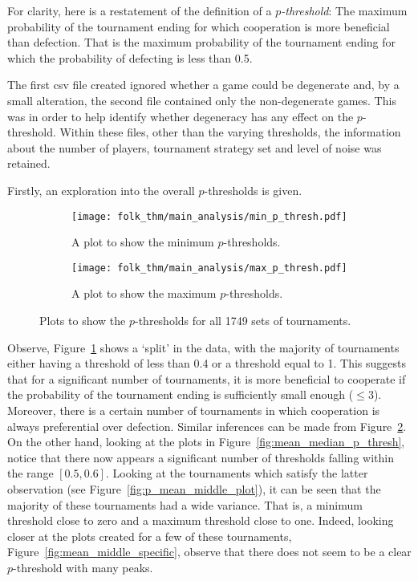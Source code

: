 For clarity, here is a restatement of the definition of a
\textit{\(p\)-threshold}: The maximum probability of the tournament ending for
which cooperation is more beneficial than defection. That is the maximum
probability of the tournament ending for which the probability of defecting is
less than 0.5.

The first csv file created ignored whether a game could be degenerate and, by a
small alteration, the second file contained only the non-degenerate games. This
was in order to help identify whether degeneracy has any effect on the
\(p\)-threshold. Within these files, other than the varying thresholds, the
information about the number of players, tournament strategy set and level of
noise was retained.

Firstly, an exploration into the overall \(p\)-thresholds is given.

\begin{figure}
    \begin{subfigure}{.45\textwidth}
        \centering
        \texttt{[image: folk\_thm/main\_analysis/min\_p\_thresh.pdf]}
        \caption{A plot to show the minimum \(p\)-thresholds.}\label{subfig:min_p_thresh}
    \end{subfigure}
    \begin{subfigure}{.45\textwidth}
        \centering
        \texttt{[image: folk\_thm/main\_analysis/max\_p\_thresh.pdf]}
        \caption{A plot to show the maximum \(p\)-thresholds.}\label{subfig:max_p_thresh}
    \end{subfigure}
    \caption{Plots to show the \(p\)-thresholds for all 1749 sets of tournaments.}\label{fig:min_max_p_thresh}
\end{figure}

Observe, Figure~\ref{subfig:min_p_thresh} shows a `split' in the data, with the
majority of tournaments either having a threshold of less than 0.4 or a
threshold equal to 1. This suggests that for a significant number of
tournaments, it is more beneficial to cooperate if the probability of the
tournament ending is sufficiently small enough (\(\le 3\)). Moreover, there is
a certain number of tournaments in which cooperation is always preferential
over defection. Similar inferences can be made from
Figure~\ref{subfig:max_p_thresh}. On the other hand, looking at the plots in
Figure~\ref{fig:mean_median_p_thresh}, notice that there now appears a
significant number of thresholds falling within the range \([0.5, 0.6]\).
Looking at the tournaments which satisfy the latter observation (see
Figure~\ref{fig:p_mean_middle_plot}), it can be seen that the majority of these
tournaments had a wide variance. That is, a minimum threshold close to zero and
a maximum threshold close to one. Indeed, looking closer at the plots created
for a few of these tournaments, Figure~\ref{fig:mean_middle_specific}, observe
that there does not seem to be a clear \(p\)-threshold with many peaks. 

